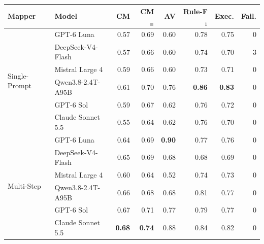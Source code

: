 \begin{tabular}{llrrrrrr}
\toprule
\textbf{Mapper} & \textbf{Model} & CM & CM$_{\equiv}$ & AV & Rule-F$_1$ & Exec. & Fail. \\
\midrule
\multirow{6}{*}{Single-Prompt} & GPT-6 Luna & 0.57 & 0.69 & 0.60 & 0.78 & 0.75 & 0 \\
 & DeepSeek-V4-Flash & 0.57 & 0.66 & 0.60 & 0.74 & 0.70 & 3 \\
 & Mistral Large 4 & 0.59 & 0.66 & 0.60 & 0.73 & 0.71 & 0 \\
 & Qwen3.8-2.4T-A95B & 0.61 & 0.70 & 0.76 & \textbf{0.86} & \textbf{0.83} & 0 \\
 & GPT-6 Sol & 0.59 & 0.67 & 0.62 & 0.76 & 0.72 & 0 \\
 & Claude Sonnet 5.5 & 0.55 & 0.64 & 0.62 & 0.76 & 0.70 & 0 \\
\midrule
\multirow{6}{*}{Multi-Step} & GPT-6 Luna & 0.64 & 0.69 & \textbf{0.90} & 0.77 & 0.76 & 0 \\
 & DeepSeek-V4-Flash & 0.65 & 0.69 & 0.68 & 0.68 & 0.69 & 0 \\
 & Mistral Large 4 & 0.60 & 0.64 & 0.52 & 0.74 & 0.73 & 0 \\
 & Qwen3.8-2.4T-A95B & 0.66 & 0.68 & 0.68 & 0.81 & 0.77 & 0 \\
 & GPT-6 Sol & 0.67 & 0.71 & 0.77 & 0.79 & 0.77 & 0 \\
 & Claude Sonnet 5.5 & \textbf{0.68} & \textbf{0.74} & 0.88 & 0.84 & 0.82 & 0 \\
\bottomrule
\end{tabular}
